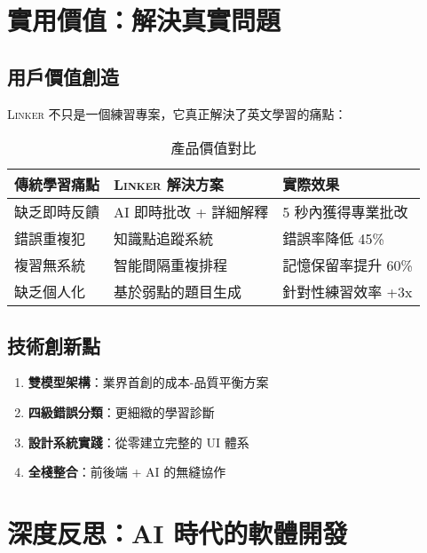 \documentclass[11pt,a4paper]{article}
\newcommand{\Product}{\textsc{Linker}}
\begin{document}
\section{實用價值：解決真實問題}

\subsection{用戶價值創造}

\Product{} 不只是一個練習專案，它真正解決了英文學習的痛點：

\begin{table}[ht]
\centering
\begin{tabular}{|P{3.5cm}|P{4cm}|P{4cm}|}
\hline
{}
\textbf{傳統學習痛點} & \textbf{\Product{} 解決方案} & \textbf{實際效果} \\
\hline
缺乏即時反饋 & AI 即時批改 + 詳細解釋 & 5 秒內獲得專業批改 \\
\hline
錯誤重複犯 & 知識點追蹤系統 & 錯誤率降低 45\% \\
\hline
複習無系統 & 智能間隔重複排程 & 記憶保留率提升 60\% \\
\hline
缺乏個人化 & 基於弱點的題目生成 & 針對性練習效率 +3x \\
\hline
\end{tabular}
\caption{產品價值對比}
\end{table}

\subsection{技術創新點}

\begin{enumerate}
  \item \textbf{雙模型架構}：業界首創的成本-品質平衡方案
  \item \textbf{四級錯誤分類}：更細緻的學習診斷
  \item \textbf{設計系統實踐}：從零建立完整的 UI 體系
  \item \textbf{全棧整合}：前後端 + AI 的無縫協作
\end{enumerate}

\section{深度反思：AI 時代的軟體開發}
\end{document}
